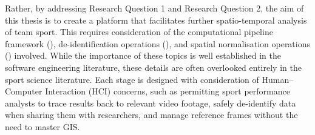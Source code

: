 Rather, by addressing Research Question 1 and Research Question 2, the aim of this thesis is to create a platform that facilitates further spatio-temporal analysis of team sport. This requires consideration of the computational pipeline framework (), de-identification operations (), and spatial normalisation operations () involved. While the importance of these topics is well established in the software engineering literature, these details are often overlooked entirely in the sport science literature. Each stage is designed with consideration of Human--Computer Interaction (HCI) concerns, such as permitting sport performance analysts to trace results back to relevant video footage, safely de-identify data when sharing them with researchers, and manage reference frames without the need to master GIS.
